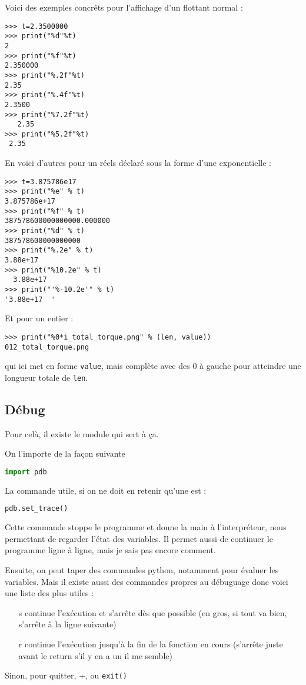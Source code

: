 \documentclass[a4paper,twoside]{article}
\begin{document}
\bigskip

Voici des exemples concrêts pour l'affichage d'un flottant normal : 
\begin{verbatim}
>>> t=2.3500000
>>> print("%d"%t)
2
>>> print("%f"%t)
2.350000
>>> print("%.2f"%t)
2.35
>>> print("%.4f"%t)
2.3500
>>> print("%7.2f"%t)
   2.35
>>> print("%5.2f"%t)
 2.35
\end{verbatim}

En voici d'autres pour un réels déclaré sous la forme d'une exponentielle :
\begin{verbatim}
>>> t=3.875786e17
>>> print("%e" % t)
3.875786e+17
>>> print("%f" % t)
387578600000000000.000000
>>> print("%d" % t)
387578600000000000
>>> print("%.2e" % t)
3.88e+17
>>> print("%10.2e" % t)
  3.88e+17
>>> print("'%-10.2e'" % t)
'3.88e+17  '
\end{verbatim}

Et pour un entier :
\begin{verbatim}
>>> print("%0*i_total_torque.png" % (len, value))
012_total_torque.png
\end{verbatim}
qui ici met en forme \texttt{value}, mais complète avec des 0 à gauche pour atteindre une longueur totale de \texttt{len}.

\subsection{Débug}
Pour celà, il existe le module  qui sert à ça.

On l'importe de la façon suivante
\begin{lstlisting}[language=python]
import pdb
\end{lstlisting}

La commande utile, si on ne doit en retenir qu'une est :
\begin{lstlisting}[language=python]
pdb.set_trace()
\end{lstlisting}

Cette commande stoppe le programme et donne la main à l'interpréteur, nous permettant de regarder l'état des variables. Il permet aussi de continuer le programme ligne à ligne, mais je sais pas encore comment.

Ensuite, on peut taper des commandes python, notamment pour évaluer les variables. Mais il existe aussi des commandes propres au débuguage donc voici une liste des plus utiles :
\begin{itemize}
\item[s] continue l'exécution et s'arrête dès que possible (en gros, si tout va bien, s'arrête à la ligne suivante)
\item[r] continue l'exécution jusqu'à la fin de la fonction en cours (s'arrête juste avant le return s'il y en a un il me semble)
\end{itemize}
Sinon, pour quitter, +, ou \texttt{exit()}
\end{document}
